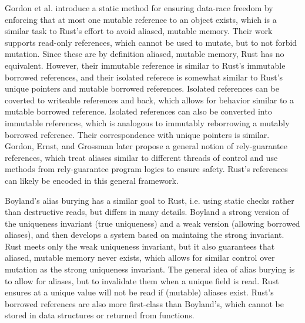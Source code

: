 Gordon et al. \cite{uniqueandrefimm} introduce a static method for ensuring data-race freedom
by enforcing that at most one mutable reference to an object exists, which is a similar task
to Rust's effort to avoid aliased, mutable memory.
Their work supports read-only references, which cannot be used to mutate, but to not forbid
mutation. Since these are by definition aliased, mutable memory, Rust has no equivalent.
However, their immutable reference is similar to Rust's immutable borrowed references,
and their isolated referece is somewhat similar to Rust's unique pointers and mutable
borrowed references. Isolated references can be coverted to writeable references and back,
which allows for behavior similar to a mutable borrowed reference. Isolated references
can also be converted into immutable references, which is analogous to immutably reborrowing
a mutably borrowed reference. Their correspondence with unique pointers is similar.
Gordon, Ernst, and Grossman \cite{relyguarantee} later propose a general notion of
rely-guarantee references, which treat aliases similar to different threads of control
and use methods from rely-guarantee program logics to ensure safety. Rust's references
can likely be encoded in this general framework.

Boyland's alias burying \cite{aliasburying} has a similar goal to Rust, i.e.
using static checks rather than destructive reads, but differs in many details.
Boyland a strong version of the uniqueness invariant (true uniqueness) and a weak
version (allowing borrowed aliases), and then develops a system based on maintaing
the strong invariant. Rust meets only the weak uniqueness invariant, but it also
guarantees that aliased, mutable memory never exists, which allows for similar control
over mutation as the strong uniqueness invariant. The general idea of alias burying
is to allow for aliases, but to invalidate them when a unique field is read.
Rust ensures at a unique value will not be read if (mutable) aliases exist.
Rust's borrowed references are also more first-class than Boyland's, which cannot
be stored in data structures or returned from functions.

